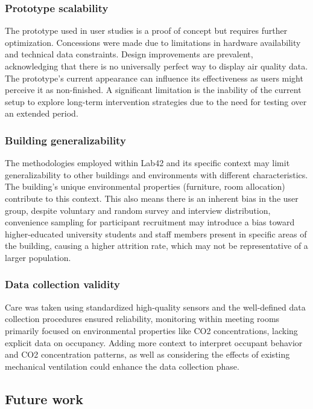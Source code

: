 \subsubsection{Prototype scalability}
The prototype used in user studies is a proof of concept but requires further optimization. Concessions were made due to limitations in hardware availability and technical data constraints. Design improvements are prevalent, acknowledging that there is no universally perfect way to display air quality data. The prototype's current appearance can influence its effectiveness as users might perceive it as non-finished. A significant limitation is the inability of the current setup to explore long-term intervention strategies due to the need for testing over an extended period. 

\subsubsection{Building generalizability}
The methodologies employed within Lab42 and its specific context may limit generalizability to other buildings and environments with different characteristics.  The building's unique environmental properties (furniture, room allocation) contribute to this context. This also means there is an inherent bias in the user group, despite voluntary and random survey and interview distribution, convenience sampling for participant recruitment may introduce a bias toward higher-educated university students and staff members present in specific areas of the building, causing a higher attrition rate, which may not be representative of a larger population. 

\subsubsection{Data collection validity}
Care was taken using standardized high-quality sensors and the well-defined data collection procedures ensured reliability, monitoring within meeting rooms primarily focused on environmental properties like CO2 concentrations, lacking explicit data on occupancy. Adding more context to interpret occupant behavior and CO2 concentration patterns, as well as considering the effects of existing mechanical ventilation could enhance the data collection phase.

\subsection{Future work}

